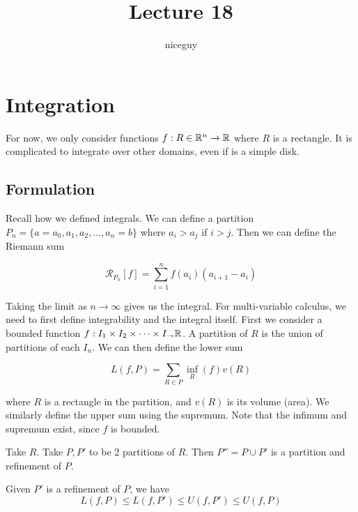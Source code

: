 \documentclass[12pt]{article}
\title{Lecture 18}
\author{niceguy}
\begin{document}
\maketitle

\section{Integration}

For now, we only consider functions $f:R \in \mathbb{R}^n \rightarrow\mathbb{R}$ where $R$ is a rectangle. It is complicated to integrate over other domains, even if is a simple disk.

\subsection{Formulation}

Recall how we defined integrals. We can define a partition $P_n = \{a = a_0, a_1,a_2,\dots,a_n = b\}$ where $a_i > a_j$ if $i > j$. Then we can define the Riemann sum

$$\mathcal R_{P_n}[f] = \sum_{i=1}^n f(a_i)(a_{i+1}-a_i)$$

Taking the limit as $n\rightarrow\infty$ gives us the integral. For multi-variable calculus, we need to first define integrability and the integral itself. First we consider a bounded function $f:I_1 \times I_2 \times \dots \times I_ \rightarrow \mathbb{R}$. A partition of $R$ is the union of partitions of each $I_n$. We can then define the lower sum

$$L(f,P) = \sum_{R \in P} \inf_R(f)v(R)$$

where $R$ is a rectangle in the partition, and $v(R)$ is its volume (area). We similarly define the upper sum using the supremum. Note that the infimum and supremum exist, since $f$ is bounded.

\begin{lem}
    Take $R$. Take $P, P'$ to be 2 partitions of $R$. Then $P'' = P \cup P'$ is a partition and refinement of $P$.
\end{lem}

\begin{lem}
    Given $P'$ is a refinement of $P$, we have
    $$L(f,P) \leq L(f,P') \leq U(f,P') \leq U(f,P)$$
\end{lem}
\end{document}
